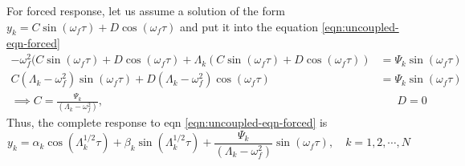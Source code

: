 For forced response, let us assume a solution of the form $y_k = C\sin(\omega_f \tau) + D \cos(\omega_f \tau)$ and put it into the equation \ref{eqn:uncoupled-eqn-forced}
\begin{align*}
-\omega_f^2(C\sin(\omega_f \tau) + D \cos(\omega_f \tau) + \Lambda_k (C\sin(\omega_f \tau) + D \cos(\omega_f \tau)) &= \Psi_k \sin(\omega_f \tau) \\
C(\Lambda_k - \omega_f^2) \sin(\omega_f \tau) + D(\Lambda_k - \omega_f^2) \cos(\omega_f \tau) &= \Psi_k \sin(\omega_f \tau) \\
\implies C = \frac{\Psi_k}{(\Lambda_k - \omega_f^2)}, &\phantom{=}~ D = 0
\end{align*}
Thus, the complete response to eqn \ref{eqn:uncoupled-eqn-forced} is 
$$y_k = \alpha_k \cos(\Lambda_k^{1/2}\tau) + \beta_k \sin(\Lambda_k^{1/2}\tau) + \frac{\Psi_k}{(\Lambda_k - \omega_f^2)}\sin(\omega_f \tau), \quad k=1,2,\cdots,N $$






%
%
